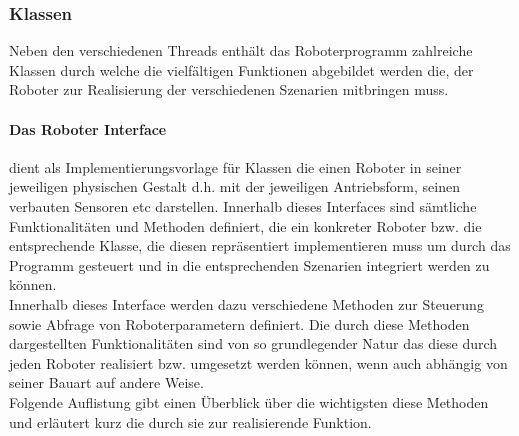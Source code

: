 \subsubsection{Klassen}
Neben den verschiedenen Threads enthält das Roboterprogramm zahlreiche Klassen durch welche die vielfältigen Funktionen abgebildet 
werden die, der Roboter zur Realisierung der verschiedenen Szenarien mitbringen muss. 
\paragraph{Das Roboter Interface}
dient als Implementierungsvorlage für Klassen die einen Roboter in seiner jeweiligen physischen Gestalt d.h. mit
der jeweiligen Antriebsform, seinen verbauten Sensoren etc darstellen. Innerhalb dieses Interfaces sind sämtliche Funktionalitäten 
und Methoden definiert, die ein konkreter Roboter bzw. die entsprechende Klasse, die diesen repräsentiert implementieren muss um durch 
das Programm gesteuert und in die entsprechenden Szenarien integriert werden zu können. \\
Innerhalb dieses Interface werden dazu verschiedene Methoden zur Steuerung sowie Abfrage von Roboterparametern definiert. Die durch 
diese Methoden dargestellten Funktionalitäten sind von so grundlegender Natur das diese durch jeden Roboter realisiert bzw. umgesetzt 
werden können, wenn auch abhängig von seiner Bauart auf andere Weise. \\
Folgende Auflistung gibt einen Überblick über die wichtigsten diese Methoden und erläutert kurz die durch sie zur realisierende Funktion.
